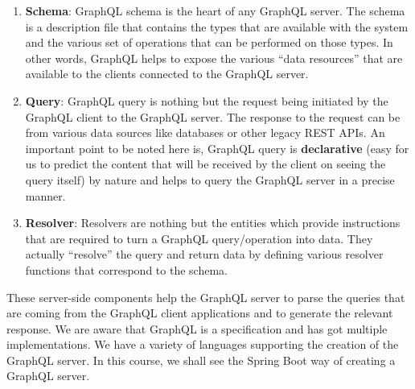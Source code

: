 \documentclass[../main.tex]{subfiles}
\begin{document}
\begin{enumerate}
  \item { \textbf{Schema}: GraphQL schema is the heart of any GraphQL server. The schema is a description file that contains the types that are available with the system and the various set of operations that can be performed on those types. In other words, GraphQL helps to expose the various “data resources” that are available to the clients connected to the GraphQL server.}
  \item { \textbf{Query}: GraphQL query is nothing but the request being initiated by the GraphQL client to the GraphQL server. The response to the request can be from various data sources like databases or other legacy REST APIs. An important point to be noted here is, GraphQL query is \textbf{declarative} (easy for us to predict the content that will be received by the client on seeing the query itself) by nature and helps to query the GraphQL server in a precise manner.}
  \item { \textbf{Resolver}: Resolvers are nothing but the entities which provide instructions that are required to turn a GraphQL query/operation into data. They actually “resolve” the query and return data by defining various resolver functions that correspond to the schema.}
\end{enumerate}
These server-side components help the GraphQL server to parse the queries that are coming from the GraphQL client applications and to generate the relevant response. 
We are aware that GraphQL is a specification and has got multiple implementations. We have a variety of languages supporting the creation of the GraphQL server. In this course, we shall see the Spring Boot way of creating a GraphQL server.

\printglossaries
\end{document}
